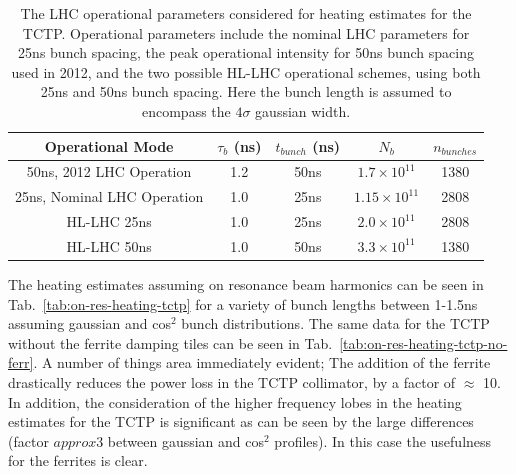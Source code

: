 \begin{table}
\caption{The LHC operational parameters considered for heating estimates for the TCTP. Operational parameters include the nominal LHC parameters for 25ns bunch spacing, the peak operational intensity for 50ns bunch spacing used in 2012, and the two possible HL-LHC operational schemes, using both 25ns and 50ns bunch spacing. Here the bunch length is assumed to encompass the $4\sigma$ gaussian width.}
\label{tab:lhc-tctp-heating-para}
\begin{center}
\begin{tabular}{c | c | c | c | c }
Operational Mode & $\tau_{b}$ (ns) & $t_{bunch}$ (ns) & $N_{b}$ & $n_{bunches}$ \\ \hline
50ns, 2012 LHC Operation & 1.2 & 50ns & $1.7 \times 10^{11}$ & 1380 \\ \hline
25ns, Nominal LHC Operation & 1.0 & 25ns & $1.15 \times 10^{11}$ & 2808 \\ \hline
HL-LHC 25ns & 1.0 & 25ns & $2.0 \times 10^{11}$ & 2808 \\ \hline
HL-LHC 50ns & 1.0 & 50ns & $3.3 \times 10^{11}$ & 1380 \\ \hline
\end{tabular}
\end{center}
\end{table}

The heating estimates assuming on resonance beam harmonics can be seen in Tab.~\ref{tab:on-res-heating-tctp} for a variety of bunch lengths between 1-1.5ns assuming gaussian and cos$^{2}$ bunch distributions. The same data for the TCTP without the ferrite damping tiles can be seen in Tab.~\ref{tab:on-res-heating-tctp-no-ferr}. A number of things area immediately evident; The addition of the ferrite drastically reduces the power loss in the TCTP collimator, by a factor of $\approx$ 10. In addition, the consideration of the higher frequency lobes in the heating estimates for the TCTP is significant as can be seen by the large differences (factor $approx 3$ between gaussian and cos$^{2}$ profiles). In this case the usefulness for the ferrites is clear.


